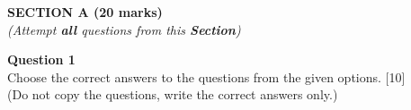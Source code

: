 \begin{center}
   \large
   \textbf{SECTION A (20 marks)}\\
   \vspace{5mm}
   \normalsize
   \textit{(Attempt \textbf{all} questions from this \textbf{Section})}
\end{center}
\par
\noindent
\textbf{Question 1}\\
Choose the correct answers to the questions from the given options. \hfill [10]\\
(Do not copy the questions, write the correct answers only.)
\par
\vspace{2mm}
